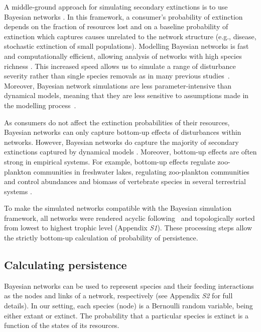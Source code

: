\documentclass[12pt]{article}
\begin{document}
\begin{spacing}{2.0}
        
        A middle‐ground approach for simulating secondary extinctions is to use Bayesian networks \citep{Eklof2013}. 
        In this framework, a consumer's probability of extinction depends on the fraction of resources lost and on a baseline probability of extinction which captures causes unrelated to the network structure (e.g., disease, stochastic extinction of small populations).
        Modelling Bayesian networks is fast and computationally efficient, allowing analysis of networks with high species richness \citep{Haussler2020}. 
        This increased speed allows us to simulate a range of disturbance severity rather than single species removals as in many previous studies~\citealp[e.g.,]{Memmott2004,Staniczenko2010,Dunne2004,Cirtwill2021_inprep}.
        Moreover, Bayesian network simulations are less parameter-intensive than dynamical models, meaning that they are less sensitive to assumptions made in the modelling process~\citep{Eklof2013}.
        
        As consumers do not affect the extinction probabilities of their resources, Bayesian networks can only capture bottom-up effects of disturbances within networks. 
        However, Bayesian networks do capture the majority of secondary extinctions captured by dynamical models \citep{Eklof2013}.
        Moreover, bottom-up effects are often strong in empirical systems.
        For example, bottom-up effects regulate zoo-plankton communities in freshwater lakes, regulating zoo-plankton communities \citep{li2020bottom} and control abundances and biomass of vertebrate species in several terrestrial systems \citep{Dobson2009food, Mduma1999food, Georgiadis2007}.
    
    
    	To make the simulated networks compatible with the Bayesian simulation framework, all networks were rendered acyclic following~\citet{Allesina2009functional} and topologically sorted from lowest to highest trophic level (Appendix \emph{S1}).
    	These processing steps allow the strictly bottom-up calculation of probability of persistence.
    	
		
	\subsection*{Calculating persistence}	
        Bayesian networks can be used to represent species and their feeding interactions as the nodes and links of a network, respectively (see Appendix \emph{S2} for full details).
        In our setting, each species (node) is a Bernoulli random variable, being either extant or extinct. 
        The probability that a particular species is extinct is a function of the states of its resources.
        

\end{spacing}
\end{document}
